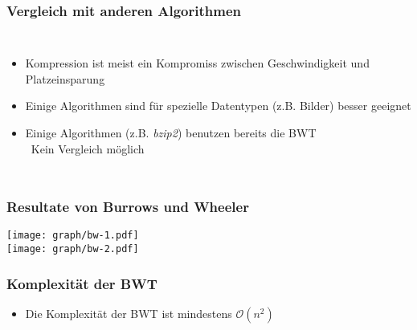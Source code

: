 \documentclass[14pt,xcolor=dvipsnames,pdftex]{beamer}
\begin{document}
\begin{frame}
 \frametitle{Vergleich mit anderen Algorithmen}
 \begin{columns}[c,onlytextwidth]
    \begin{itemize}
    \item Kompression ist meist ein Kompromiss zwischen Geschwindigkeit und Platzeinsparung
    \item Einige Algorithmen sind für spezielle Datentypen (z.B. Bilder) besser geeignet
    \item Einige Algorithmen (z.B. \textit{bzip2}) benutzen bereits die BWT\\
    \textrightarrow\ Kein Vergleich möglich
    \end{itemize}
 \end{columns}
\end{frame}

\begin{frame}[allowframebreaks]
 \frametitle{Resultate von Burrows und Wheeler}
 \texttt{[image: graph/bw-1.pdf]}
 \framebreak
 \\
 \texttt{[image: graph/bw-2.pdf]}
\end{frame}


\begin{frame}
 \frametitle{Komplexität der BWT}
 \begin{itemize}
  \item Die Komplexität der BWT ist mindestens $\mathcal{O}(n^2)$
 \end{itemize}
\end{frame}
\end{document}
